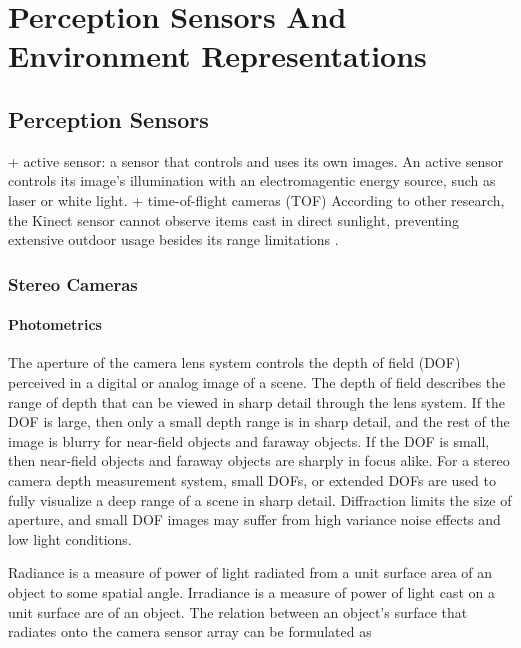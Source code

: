 \documentclass[12pt,a4paper,oneside,pdftex]{report}
\begin{document}
\chapter{Perception Sensors And Environment Representations}
\label{chapter:perception_sensors_and_environment_representations}

\section{Perception Sensors}
\label{section:perception_sensors}

+ active sensor: a sensor that controls and uses its own images. An active sensor controls its image's illumination with an electromagentic energy source, such as laser or white light.
+ time-of-flight cameras (TOF)
According to other research, the Kinect sensor cannot observe items cast in direct sunlight, preventing extensive outdoor usage besides its range limitations \cite{tikkanen13}.  

\subsection{Stereo Cameras}
\label{subsection:stereo_cameras}

\subsubsection{Photometrics}
\label{subsubsection:photometrics}

The aperture of the camera lens system controls the depth of field (DOF) perceived in a digital or analog image of a scene. The depth of field describes the range of depth that can be viewed in sharp detail through the lens system. If the DOF is large, then only a small depth range is in sharp detail, and the rest of the image is blurry for near-field objects and faraway objects. If the DOF is small, then near-field objects and faraway objects are sharply in focus alike. For a stereo camera depth measurement system, small DOFs, or extended DOFs are used to fully visualize a deep range of a scene in sharp detail. Diffraction limits the size of aperture, and small DOF images may suffer from high variance noise effects and low light conditions.

Radiance is a measure of power of light radiated from a unit surface area of an object to some spatial angle. 
Irradiance is a measure of power of light cast on a unit surface are of an object.
The relation between an object's surface that radiates onto the camera sensor array can be formulated as
\end{document}
